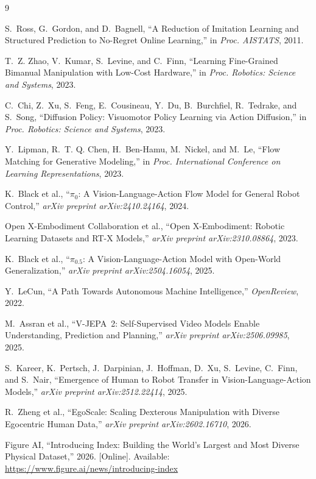 \documentclass[10pt,conference]{IEEEtran}
\begin{document}
\begin{thebibliography}{9}

S.~Ross, G.~Gordon, and D.~Bagnell,
``A Reduction of Imitation Learning and Structured Prediction to No-Regret
Online Learning,'' in \emph{Proc. AISTATS}, 2011.

T.~Z. Zhao, V.~Kumar, S.~Levine, and C.~Finn,
``Learning Fine-Grained Bimanual Manipulation with Low-Cost Hardware,''
in \emph{Proc. Robotics: Science and Systems}, 2023.

C.~Chi, Z.~Xu, S.~Feng, E.~Cousineau, Y.~Du, B.~Burchfiel, R.~Tedrake,
and S.~Song,
``Diffusion Policy: Visuomotor Policy Learning via Action Diffusion,''
in \emph{Proc. Robotics: Science and Systems}, 2023.

Y.~Lipman, R.~T. Q. Chen, H.~Ben-Hamu, M.~Nickel, and M.~Le,
``Flow Matching for Generative Modeling,''
in \emph{Proc. International Conference on Learning Representations}, 2023.

K.~Black et al.,
``$\pi_0$: A Vision-Language-Action Flow Model for General Robot Control,''
\emph{arXiv preprint arXiv:2410.24164}, 2024.

Open X-Embodiment Collaboration et al.,
``Open X-Embodiment: Robotic Learning Datasets and RT-X Models,''
\emph{arXiv preprint arXiv:2310.08864}, 2023.

K.~Black et al.,
``$\pi_{0.5}$: A Vision-Language-Action Model with Open-World
Generalization,''
\emph{arXiv preprint arXiv:2504.16054}, 2025.

Y.~LeCun,
``A Path Towards Autonomous Machine Intelligence,''
\emph{OpenReview}, 2022.

M.~Assran et al.,
``V-JEPA~2: Self-Supervised Video Models Enable Understanding,
Prediction and Planning,''
\emph{arXiv preprint arXiv:2506.09985}, 2025.

S.~Kareer, K.~Pertsch, J.~Darpinian, J.~Hoffman, D.~Xu, S.~Levine,
C.~Finn, and S.~Nair,
``Emergence of Human to Robot Transfer in Vision-Language-Action Models,''
\emph{arXiv preprint arXiv:2512.22414}, 2025.

R.~Zheng et al.,
``EgoScale: Scaling Dexterous Manipulation with Diverse Egocentric Human
Data,''
\emph{arXiv preprint arXiv:2602.16710}, 2026.

Figure AI,
``Introducing Index: Building the World's Largest and Most Diverse Physical
Dataset,'' 2026. [Online]. Available:
\url{https://www.figure.ai/news/introducing-index}


\end{thebibliography}
\end{document}

